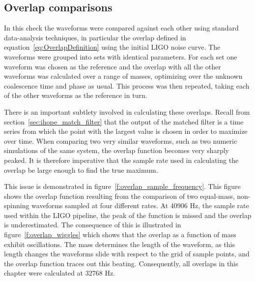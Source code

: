 \subsection{Overlap comparisons}
\label{ssec:ninja2_overlap_comparisons}

In this check the waveforms were compared against each other using
standard data-analysis techniques, in particular the overlap defined
in equation~\ref{eq:OverlapDefinition}  using the initial LIGO noise
curve.  The waveforms were grouped into sets with identical
parameters.  For each set one waveform was chosen as the reference and
the overlap with all the other waveforms was calculated over a range of
masses, optimizing over the unknown coalescence time and phase as
usual.  This process was then repeated, taking each of the other
waveforms as the reference in turn.

There is an important subtlety involved in calculating these overlaps.
Recall from section~\ref{sec:ihope_match_filter} that the output of
the matched filter is a time series from which the point with the
largest value is chosen in order to maximize over time.  When
comparing two very similar waveforms, such as two numeric simulations
of the same system, the overlap function becomes very sharply peaked.
It is therefore imperative that the sample rate used in calculating 
the overlap be large enough to find the true maximum.

This issue is demonstrated in figure~\ref{f:overlap_sample_frequency}.
This figure shows the overlap function resulting from the comparison
of two equal-mass, non-spinning waveforms sampled at four different
rates.  At 40906 Hz, the sample rate used within the LIGO pipeline,
the peak of the function is missed and the overlap is underestimated.
The consequence of this is illustrated in
figure~\ref{f:overlap_wiggles} which shows that the overlap as a
function of mass exhibit oscillations.  The mass determines the length
of the waveform, as this length changes the waveforms slide with
respect to the grid of sample points, and the overlap function traces
out this beating.  Consequently, all overlaps in this chapter were
calculated at 32768 Hz.

